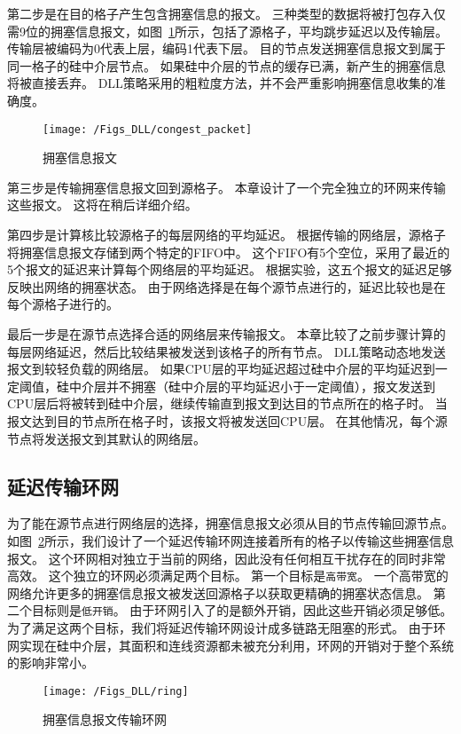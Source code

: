 第二步是在目的格子产生包含拥塞信息的报文。
三种类型的数据将被打包存入仅需9位的拥塞信息报文，如图~\ref{fig:congest_packet}所示，包括了源格子，平均跳步延迟以及传输层。
传输层被编码为0代表上层，编码1代表下层。
目的节点发送拥塞信息报文到属于同一格子的硅中介层节点。
如果硅中介层的节点的缓存已满，新产生的拥塞信息将被直接丢弃。
DLL策略采用的粗粒度方法，并不会严重影响拥塞信息收集的准确度。

\begin{figure}[htbp] %
  \centering
  \texttt{[image: /Figs\_DLL/congest\_packet]}
  \caption{拥塞信息报文}
  \label{fig:congest_packet}
\end{figure}


第三步是传输拥塞信息报文回到源格子。
本章设计了一个完全独立的环网来传输这些报文。
这将在稍后详细介绍。

第四步是计算核比较源格子的每层网络的平均延迟。
根据传输的网络层，源格子将拥塞信息报文存储到两个特定的FIFO中。
这个FIFO有5个空位，采用了最近的5个报文的延迟来计算每个网络层的平均延迟。
根据实验，这五个报文的延迟足够反映出网络的拥塞状态。
由于网络选择是在每个源节点进行的，延迟比较也是在每个源格子进行的。

最后一步是在源节点选择合适的网络层来传输报文。
本章比较了之前步骤计算的每层网络延迟，然后比较结果被发送到该格子的所有节点。
DLL策略动态地发送报文到较轻负载的网络层。
如果CPU层的平均延迟超过硅中介层的平均延迟到一定阈值，硅中介层并不拥塞（硅中介层的平均延迟小于一定阈值），报文发送到CPU层后将被转到硅中介层，继续传输直到报文到达目的节点所在的格子时。
当报文达到目的节点所在格子时，该报文将被发送回CPU层。
在其他情况，每个源节点将发送报文到其默认的网络层。


\subsection{延迟传输环网}
为了能在源节点进行网络层的选择，拥塞信息报文必须从目的节点传输回源节点。
如图~\ref{fig:ring}所示，我们设计了一个延迟传输环网连接着所有的格子以传输这些拥塞信息报文。
这个环网相对独立于当前的网络，因此没有任何相互干扰存在的同时非常高效。
这个独立的环网必须满足两个目标。
第一个目标是\texttt{高带宽}。
一个高带宽的网络允许更多的拥塞信息报文被发送回源格子以获取更精确的拥塞状态信息。
第二个目标则是\texttt{低开销}。
由于环网引入了的是额外开销，因此这些开销必须足够低。
为了满足这两个目标，我们将延迟传输环网设计成多链路无阻塞的形式。
由于环网实现在硅中介层，其面积和连线资源都未被充分利用，环网的开销对于整个系统的影响非常小。

\begin{figure}[htbp] %
  \centering
  \texttt{[image: /Figs\_DLL/ring]}
  \caption{拥塞信息报文传输环网}
  \label{fig:ring}
\end{figure}

